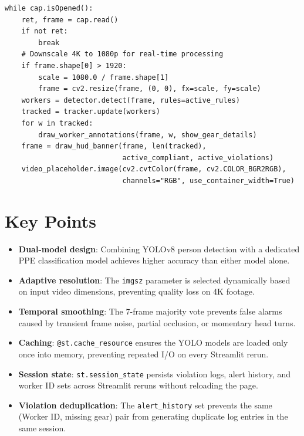 \documentclass[12pt,a4paper]{report}
\begin{document}
\begin{lstlisting}[caption={Core real-time processing loop (app.py)}]
while cap.isOpened():
    ret, frame = cap.read()
    if not ret:
        break
    # Downscale 4K to 1080p for real-time processing
    if frame.shape[0] > 1920:
        scale = 1080.0 / frame.shape[1]
        frame = cv2.resize(frame, (0, 0), fx=scale, fy=scale)
    workers = detector.detect(frame, rules=active_rules)
    tracked = tracker.update(workers)
    for w in tracked:
        draw_worker_annotations(frame, w, show_gear_details)
    frame = draw_hud_banner(frame, len(tracked),
                            active_compliant, active_violations)
    video_placeholder.image(cv2.cvtColor(frame, cv2.COLOR_BGR2RGB),
                            channels="RGB", use_container_width=True)
\end{lstlisting}

\section{Key Points}
\begin{itemize}
    \item \textbf{Dual-model design}: Combining YOLOv8 person detection with a dedicated PPE classification model achieves higher accuracy than either model alone.
    \item \textbf{Adaptive resolution}: The \texttt{imgsz} parameter is selected dynamically based on input video dimensions, preventing quality loss on 4K footage.
    \item \textbf{Temporal smoothing}: The 7-frame majority vote prevents false alarms caused by transient frame noise, partial occlusion, or momentary head turns.
    \item \textbf{Caching}: \texttt{@st.cache\_resource} ensures the YOLO models are loaded only once into memory, preventing repeated I/O on every Streamlit rerun.
    \item \textbf{Session state}: \texttt{st.session\_state} persists violation logs, alert history, and worker ID sets across Streamlit reruns without reloading the page.
    \item \textbf{Violation deduplication}: The \texttt{alert\_history} set prevents the same (Worker ID, missing gear) pair from generating duplicate log entries in the same session.
\end{itemize}

\end{document}
